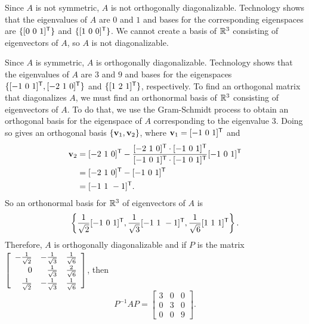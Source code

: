\begin{example}
	\item  Since $A$ is not symmetric, $A$ is not orthogonally diagonalizable. Technology shows that the eigenvalues of $A$ are $0$ and $1$ and bases for the corresponding eigenspaces are $\{[0 \ 0 \ 1]^{\mathsf{T}}\}$ and $\{ [1 \ 0\ 0]^{\mathsf{T}} \}$. We cannot create a basis of $\mathbb{R}^3$ consisting of eigenvectors of $A$, so $A$ is not diagonalizable. 

	\item  Since $A$ is symmetric, $A$ is orthogonally diagonalizable. Technology shows that the eigenvalues of $A$ are $3$ and $9$ and bases for the eigenspaces $\{[-1 \ 0 \ 1]^{\tr}, [-2 \ 1 \ 0]^{\tr}\}$ and $\{ [1 \ 2 \ 1]^{\mathsf{T}} \}$, respectively. To find an orthogonal matrix that diagonalizes $A$, we must find an orthonormal basis of $\mathbb{R}^3$ consisting of eigenvectors of $A$. To do that, we use the Gram-Schmidt process to obtain an orthogonal basis for the eigenspace of $A$ corresponding to the eigenvalue $3$. Doing so gives an orthogonal basis $\{\mathbf{v}_1, \mathbf{v}_2\}$, where $\vv_1 = [-1 \ 0 \ 1]^{\tr}$ and 
\begin{align*}
\vv_2 &=  [-2 \ 1 \ 0]^{\tr} - \frac{ [-2 \ 1 \ 0]^{\tr} \cdot [-1 \ 0 \ 1]^{\tr}}{[-1 \ 0 \ 1]^{\tr} \cdot [-1 \ 0 \ 1]^{\tr}} [-1 \ 0 \ 1]^{\tr} \\
	&=  [-2 \ 1 \ 0]^{\tr} - [-1 \ 0 \ 1]^{\tr} \\
	&= [ -1 \ 1 \ -1]^{\tr}.
\end{align*}
So an orthonormal basis for $\mathbb{R}^3$ of eigenvectors of $A$ is 
\[\left\{\frac{1}{\sqrt{2}} [-1 \ 0 \ 1]^{\tr}, \frac{1}{\sqrt{3}}[ -1 \ 1 \ -1]^{\tr}, \frac{1}{\sqrt{6}}[1 \ 1 \ 1]^{\tr} \right\}.\] 
Therefore, $A$ is orthogonally diagonalizable and if $P$ is the matrix $\left[{\renewcommand{\arraystretch}{1.2} \begin{array}{rrc} -\frac{1}{\sqrt{2}}&-\frac{1}{\sqrt{3}}&\frac{1}{\sqrt{6}}\\0&\frac{1}{\sqrt{3}}&\frac{2}{\sqrt{6}}\\\frac{1}{\sqrt{2}}&-\frac{1}{\sqrt{3}}&\frac{1}{\sqrt{6}} \end{array}} \right]$, then 
\[P^{-1}AP = \left[ \begin{array}{ccc} 3&0&0\\0&3&0\\0&0&9 \end{array} \right].\] 

	\ea


\end{example}

